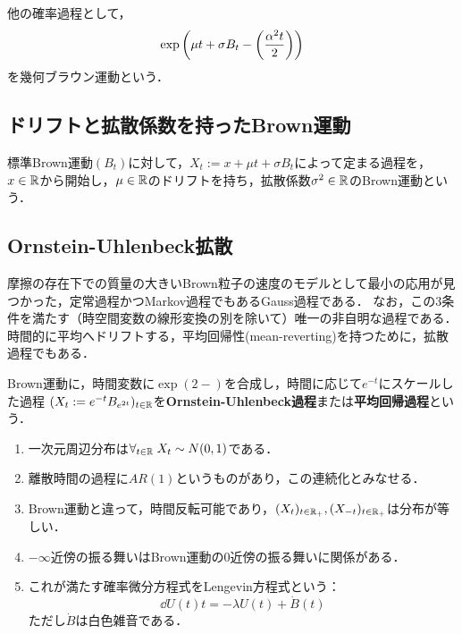 \documentclass[uplatex,dvipdfmx]{jsreport}
\begin{document}
\begin{example}
    他の確率過程として，
    \[\exp\left(\mu t+\sigma B_t-\left(\frac{\alpha^2t}{2}\right)\right)\]
    を幾何ブラウン運動という．
\end{example}

\subsection{ドリフトと拡散係数を持ったBrown運動}

\begin{example}
    標準Brown運動$(B_t)$に対して，$X_t:=x+\mu t+\sigma B_t$によって定まる過程を，$x\in\mathbb{R}$から開始し，$\mu\in\mathbb{R}$のドリフトを持ち，拡散係数$\sigma^2\in\mathbb{R}$のBrown運動という．
\end{example}

\subsection{Ornstein-Uhlenbeck拡散}

\begin{tcolorbox}[colframe=ForestGreen, colback=ForestGreen!10!white,breakable,colbacktitle=ForestGreen!40!white,coltitle=black,fonttitle=\bfseries\sffamily,
title=]
    摩擦の存在下での質量の大きいBrown粒子の速度のモデルとして最小の応用が見つかった，定常過程かつMarkov過程でもあるGauss過程である．
    なお，この3条件を満たす（時空間変数の線形変換の別を除いて）唯一の非自明な過程である．
    時間的に平均へドリフトする，平均回帰性(mean-reverting)を持つために，拡散過程でもある．
\end{tcolorbox}

\begin{definition}
    Brown運動に，時間変数に$\exp(2-)$を合成し，時間に応じて$e^{-t}$にスケールした過程
    $(X_t:=e^{-t}B_{e^{2t}})_{t\in\mathbb{R}}$を\textbf{Ornstein-Uhlenbeck過程}または\textbf{平均回帰過程}という．
\end{definition}
\begin{remarks}\mbox{}
    \begin{enumerate}
        \item 一次元周辺分布は$\forall_{t\in\mathbb{R}}\;X_t\sim N(0,1)$である．
        \item 離散時間の過程に$AR(1)$というものがあり，この連続化とみなせる．
        \item Brown運動と違って，時間反転可能であり，$(X_t)_{t\in\mathbb{R}_+},(X_{-t})_{t\in\mathbb{R}_+}$は分布が等しい．
        \item $-\infty$近傍の振る舞いはBrown運動の$0$近傍の振る舞いに関係がある．
        \item これが満たす確率微分方程式をLengevin方程式という：
        \[\dd{U(t)}{t}=-\lambda U(t)+\dot{B}(t)\]
        ただし$\dot{B}$は白色雑音である．
    \end{enumerate}
\end{remarks}
\end{document}
